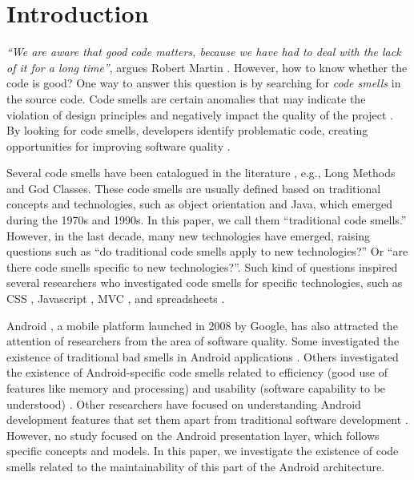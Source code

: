 
\section{Introduction}

\emph{``We are aware that good code matters, because we have had to deal with the lack of it for a long time''}, argues Robert Martin \cite{CleanCode:08}. However, how to know whether the code is good? One way to answer this question is by searching for \emph{code smells} in the source code. Code smells are certain anomalies that may indicate the violation of design principles and negatively impact the quality of the project \cite{Refactoring:14}. By looking for code smells, developers identify problematic code, creating opportunities for improving software quality \cite{Refactoring:99}.

Several code smells have been catalogued in the literature \cite{Refactoring:99,CleanCode:08,Refactoring:14,Webster:95}, e.g., Long Methods and God Classes. These code smells are usually defined based on traditional concepts and technologies, such as object orientation and Java, which emerged during the 1970s and 1990s. In this paper, we call them ``traditional code smells.'' However, in the last decade, many new technologies have emerged, raising questions such as ``do traditional code smells apply to new technologies?'' Or ``are there code smells specific to new technologies?''. Such kind of questions inspired several researchers who investigated code smells for specific technologies, such as CSS \cite{CSSCodeSmell}, Javascript \cite{JavascriptSmells}, MVC  \cite{AnicheSmellsMVC:17,MvcSmells:16}, and spreadsheets \cite{SpreadsheetsSmells:12}. 

Android \cite{OHAReleasesAndroidSDK:07}, a mobile platform launched in 2008 by Google, has also attracted the attention of researchers from the area of software quality. Some investigated the existence of traditional bad smells in Android applications \cite{Hecht:15,DomainMatters,MobileSmells:13}. Others investigated the existence of Android-specific code smells related to efficiency (good use of features like memory and processing) and usability (software capability to be understood) \cite{RemovingEnergySmells:12, 30QualitySmells:14}. Other researchers have focused on understanding Android development features that set them apart from traditional software development \cite{Mantyla2013}. However, no study focused on the Android presentation layer, which follows specific concepts and models. In this paper, we investigate the existence of code smells related to the maintainability of this part of the Android architecture. 

